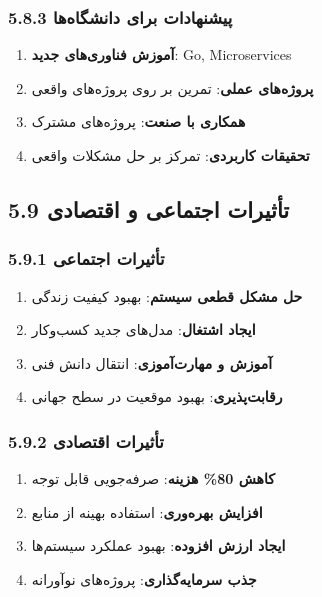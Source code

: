 \documentclass[
]{article}
\providecommand{\tightlist}{%
  \setlength{\itemsep}{0pt}\setlength{\parskip}{0pt}}
\begin{document}
\subsubsection{5.8.3 پیشنهادات برای
دانشگاه‌ها}\label{ux67eux6ccux634ux646ux647ux627ux62fux627ux62a-ux628ux631ux627ux6cc-ux62fux627ux646ux634ux6afux627ux647ux647ux627}

\begin{enumerate}
\def\labelenumi{\arabic{enumi}.}
\tightlist
\item
  \textbf{آموزش فناوری‌های جدید}: Go, Microservices
\item
  \textbf{پروژه‌های عملی}: تمرین بر روی پروژه‌های واقعی
\item
  \textbf{همکاری با صنعت}: پروژه‌های مشترک
\item
  \textbf{تحقیقات کاربردی}: تمرکز بر حل مشکلات واقعی
\end{enumerate}

\subsection{5.9 تأثیرات اجتماعی و
اقتصادی}\label{ux62aux623ux62bux6ccux631ux627ux62a-ux627ux62cux62aux645ux627ux639ux6cc-ux648-ux627ux642ux62aux635ux627ux62fux6cc}

\subsubsection{5.9.1 تأثیرات
اجتماعی}\label{ux62aux623ux62bux6ccux631ux627ux62a-ux627ux62cux62aux645ux627ux639ux6cc}

\begin{enumerate}
\def\labelenumi{\arabic{enumi}.}
\tightlist
\item
  \textbf{حل مشکل قطعی سیستم}: بهبود کیفیت زندگی
\item
  \textbf{ایجاد اشتغال}: مدل‌های جدید کسب‌وکار
\item
  \textbf{آموزش و مهارت‌آموزی}: انتقال دانش فنی
\item
  \textbf{رقابت‌پذیری}: بهبود موقعیت در سطح جهانی
\end{enumerate}

\subsubsection{5.9.2 تأثیرات
اقتصادی}\label{ux62aux623ux62bux6ccux631ux627ux62a-ux627ux642ux62aux635ux627ux62fux6cc}

\begin{enumerate}
\def\labelenumi{\arabic{enumi}.}
\tightlist
\item
  \textbf{کاهش 80\% هزینه}: صرفه‌جویی قابل توجه
\item
  \textbf{افزایش بهره‌وری}: استفاده بهینه از منابع
\item
  \textbf{ایجاد ارزش افزوده}: بهبود عملکرد سیستم‌ها
\item
  \textbf{جذب سرمایه‌گذاری}: پروژه‌های نوآورانه
\end{enumerate}
\end{document}
